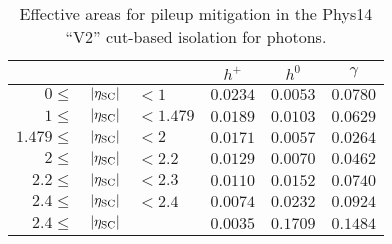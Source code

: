 \begin{table}[!ht]
\centering
\begin{tabular}{|rcl|c|c|c|}
\hline
                          &&& $h^+$    & $h^0$    & $\gamma$ \\
\hline
 $0     \leq$ & $|\eta_{\mbox{\scriptsize{SC}}}|$ & $< 1$     & $0.0234$ & $0.0053$ & $0.0780$ \\
 $1     \leq$ & $|\eta_{\mbox{\scriptsize{SC}}}|$ & $< 1.479$ & $0.0189$ & $0.0103$ & $0.0629$ \\
 $1.479 \leq$ & $|\eta_{\mbox{\scriptsize{SC}}}|$ & $< 2$     & $0.0171$ & $0.0057$ & $0.0264$ \\
 $2     \leq$ & $|\eta_{\mbox{\scriptsize{SC}}}|$ & $< 2.2$   & $0.0129$ & $0.0070$ & $0.0462$ \\
 $2.2   \leq$ & $|\eta_{\mbox{\scriptsize{SC}}}|$ & $< 2.3$   & $0.0110$ & $0.0152$ & $0.0740$ \\
 $2.4   \leq$ & $|\eta_{\mbox{\scriptsize{SC}}}|$ & $< 2.4$   & $0.0074$ & $0.0232$ & $0.0924$ \\
 $2.4   \leq$ & $|\eta_{\mbox{\scriptsize{SC}}}|$ &           & $0.0035$ & $0.1709$ & $0.1484$ \\
\hline
\end{tabular}
\caption{Effective areas for pileup mitigation in the Phys14 ``V2'' cut-based isolation for photons.}
\label{tab:effarea}
\end{table}
